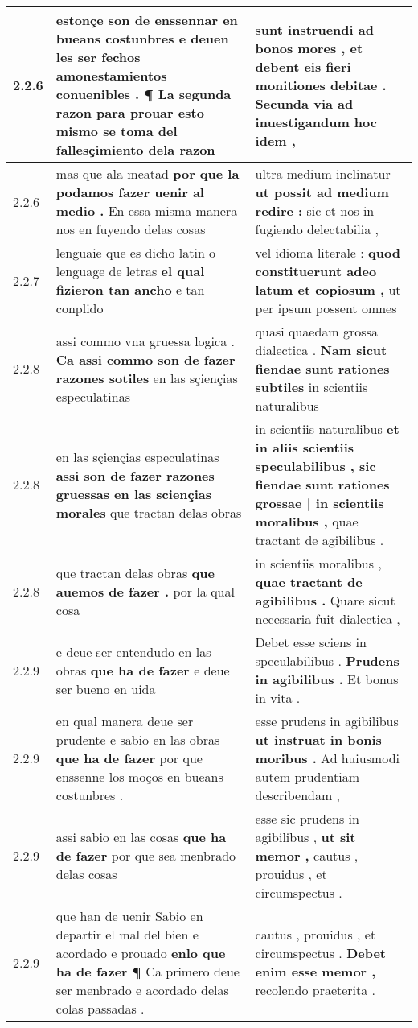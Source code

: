 \begin{tabular}{|p{1cm}|p{6.5cm}|p{6.5cm}|}
2.2.6 & estonçe son de enssennar en bueans costunbres \textbf{ e deuen les ser fechos amonestamientos conuenibles . } ¶ La segunda razon para prouar esto mismo se toma del fallesçimiento dela razon & sunt instruendi ad bonos mores , \textbf{ et debent eis fieri monitiones debitae . } Secunda via ad inuestigandum hoc idem , \\\hline
2.2.6 & mas que ala meatad \textbf{ por que la podamos fazer uenir al medio . } En essa misma manera nos en fuyendo delas cosas & ultra medium inclinatur \textbf{ ut possit ad medium redire : } sic et nos in fugiendo delectabilia , \\\hline
2.2.7 & lenguaie que es dicho latin o lenguage de letras \textbf{ el qual fizieron tan ancho } e tan conplido & vel idioma literale : \textbf{ quod constituerunt adeo latum et copiosum , } ut per ipsum possent omnes \\\hline
2.2.8 & assi commo vna gruessa logica . \textbf{ Ca assi commo son de fazer razones sotiles } en las sçiençias especulatinas & quasi quaedam grossa dialectica . \textbf{ Nam sicut fiendae sunt rationes subtiles } in scientiis naturalibus \\\hline
2.2.8 & en las sçiençias especulatinas \textbf{ assi son de fazer razones gruessas en las sciençias morales } que tractan delas obras & in scientiis naturalibus \textbf{ et in aliis scientiis speculabilibus , sic fiendae sunt rationes grossae | in scientiis moralibus , } quae tractant de agibilibus . \\\hline
2.2.8 & que tractan delas obras \textbf{ que auemos de fazer . } por la qual cosa & in scientiis moralibus , \textbf{ quae tractant de agibilibus . } Quare sicut necessaria fuit dialectica , \\\hline
2.2.9 & e deue ser entendudo en las obras \textbf{ que ha de fazer } e deue ser bueno en uida & Debet esse sciens in speculabilibus . \textbf{ Prudens in agibilibus . } Et bonus in vita . \\\hline
2.2.9 & en qual manera deue ser prudente e sabio en las obras \textbf{ que ha de fazer } por que enssenne los moços en bueans costunbres . & esse prudens in agibilibus \textbf{ ut instruat in bonis moribus . } Ad huiusmodi autem prudentiam describendam , \\\hline
2.2.9 & assi sabio en las cosas \textbf{ que ha de fazer } por que sea menbrado delas cosas & esse sic prudens in agibilibus , \textbf{ ut sit memor , } cautus , prouidus , et circumspectus . \\\hline
2.2.9 & que han de uenir Sabio en departir el mal del bien e acordado e prouado \textbf{ enlo que ha de fazer ¶ } Ca primero deue ser menbrado e acordado delas colas passadas . & cautus , prouidus , et circumspectus . \textbf{ Debet enim esse memor , } recolendo praeterita . \\\hline

\end{tabular}
